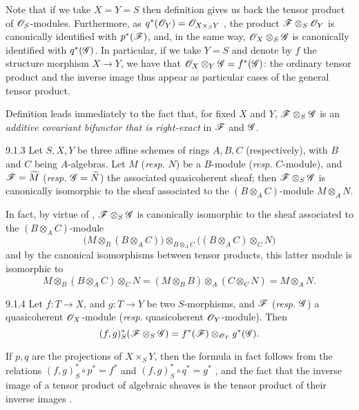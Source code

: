 \documentclass{book}
\begin{document}
Note that if we take $X=Y=S$ then definition  gives us back the tensor
product of $\mathscr{O}_S$-modules. Furthermore, as $q^\ast(\mathscr{O}_Y)=\mathscr{O}_{X\times_S Y}$
, the product $\mathscr{F}\otimes_S\mathscr{O}_Y$ is canonically
identified with $p^\ast(\mathscr{F})$, and, in the same way,
$\mathscr{O}_X\otimes_S\mathscr{G}$ is canonically identified with $q^\ast(\mathscr{G})$. In
particular, if we take $Y=S$ and denote by $f$ the structure morphism $X\to Y$,
we have that $\mathscr{O}_X\otimes_Y\mathscr{G}=f^\ast(\mathscr{G})$: the ordinary tensor
product and the inverse image thus appear as particular cases of the general
tensor product.

Definition  leads immediately to the fact that, for fixed $X$ and
$Y$, $\mathscr{F}\otimes_S\mathscr{G}$ is an \emph{additive covariant bifunctor that
is right-exact} in $\mathscr{F}$ and $\mathscr{G}$.

\begin{envs}[Proposition]{9.1.3}
\label{prop-1.9.1.3}
Let $S,X,Y$ be three affine schemes of rings
$A,B,C$ (respectively), with $B$ and $C$ being $A$-algebras. Let $M$
(\emph{resp.} $N$) be a $B$-module (\emph{resp.} $C$-module), and
$\mathscr{F}=\widetilde{M}$ (\emph{resp.} $\mathscr{G}=\widetilde{N}$) the
associated quasicoherent sheaf; then $\mathscr{F}\otimes_S\mathscr{G}$ is
canonically isomorphic to the sheaf associated to the $(B\otimes_A C)$-module
$M\otimes_A N$.
\end{envs}

In fact, by virtue of , $\mathscr{F}\otimes_S\mathscr{G}$
is canonically isomorphic to the sheaf associated to the $(B\otimes_A C)$-module
\[
  \big(M\otimes_B(B\otimes_A C)\big)\otimes_{B\otimes_A C}\big((B\otimes_A C)\otimes_C N\big)
\]
and by the canonical isomorphisms between tensor
products, this latter module is isomorphic to
\[
  M\otimes_B(B\otimes_A C)\otimes_C N=(M\otimes_B B)\otimes_A(C\otimes_C N)=M\otimes_A N.
\]

\begin{envs}[Proposition]{9.1.4}
\label{prop-1.9.1.4}
Let $f\colon T\to X$, and $g\colon T\to Y$ be
two $S$-morphisms, and $\mathscr{F}$ (\emph{resp.} $\mathscr{G}$) a quasicoherent
$\mathscr{O}_X$-module (\emph{resp.} quasicoherent $\mathscr{O}_Y$-module). Then
\[
  (f,g)^\ast_S(\mathscr{F}\otimes_S\mathscr{G})=f^\ast(\mathscr{F})\otimes_{\mathscr{O}_T}g^\ast(\mathscr{G}).
\]
\end{envs}

If $p,q$ are the projections of $X\times_S Y$, then the formula in fact follows
from the relations $(f,g)^\ast_S\circ p^\ast=f^\ast$ and
$(f,g)^\ast_S\circ q^\ast=g^\ast$ , and the fact that the inverse
image of a tensor product of algebraic sheaves is the tensor product of their inverse
images .
\end{document}
